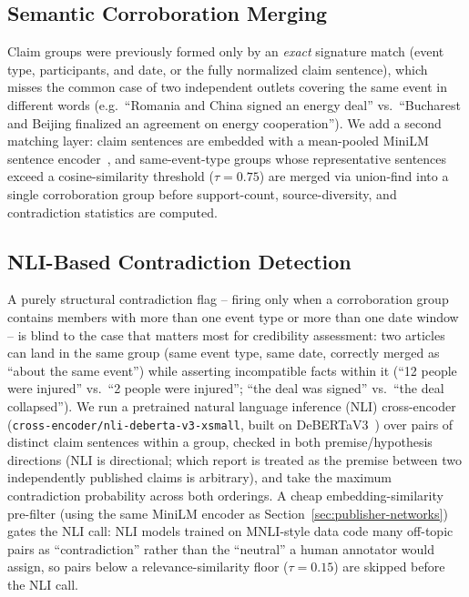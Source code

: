 \documentclass[conference]{IEEEtran}
\begin{document}
\subsection{Semantic Corroboration Merging}

Claim groups were previously formed only by an \emph{exact} signature match
(event type, participants, and date, or the fully normalized claim
sentence), which misses the common case of two independent outlets covering
the same event in different words (e.g.\ ``Romania and China signed an
energy deal'' vs.\ ``Bucharest and Beijing finalized an agreement on energy
cooperation''). We add a second matching layer: claim sentences are embedded
with a mean-pooled MiniLM sentence encoder~\cite{wang2020minilm}, and
same-event-type groups whose representative sentences exceed a cosine-similarity
threshold ($\tau{=}0.75$) are merged via union-find into a single
corroboration group before support-count, source-diversity, and contradiction
statistics are computed.

\subsection{NLI-Based Contradiction Detection}

A purely structural contradiction flag -- firing only when a corroboration
group contains members with more than one event type or more than one date
window -- is blind to the case that matters most for credibility assessment:
two articles can land in the same group (same event type, same date, correctly
merged as ``about the same event'') while asserting incompatible facts within
it (``12 people were injured'' vs.\ ``2 people were injured''; ``the deal was
signed'' vs.\ ``the deal collapsed''). We run a pretrained natural language
inference (NLI) cross-encoder (\texttt{cross-encoder/nli-deberta-v3-xsmall},
built on DeBERTaV3~\cite{he2021debertav3}) over pairs of distinct claim
sentences within a group, checked in both premise/hypothesis directions
(NLI is directional; which report is treated as the premise between two
independently published claims is arbitrary), and take the maximum
contradiction probability across both orderings. A cheap embedding-similarity
pre-filter (using the same MiniLM encoder as Section~\ref{sec:publisher-networks})
gates the NLI call: NLI models trained on MNLI-style data code many
off-topic pairs as ``contradiction'' rather than the ``neutral'' a human
annotator would assign, so pairs below a relevance-similarity floor
($\tau{=}0.15$) are skipped before the NLI call.
\end{document}
